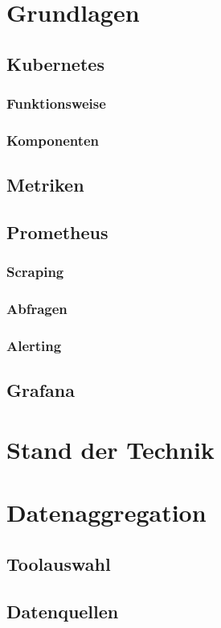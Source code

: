 \documentclass[a4paper,12pt]{scrartcl}
\begin{document}
\section{Grundlagen}
\subsection{Kubernetes}
\subsubsection{Funktionsweise}
\subsubsection{Komponenten}
\subsection{Metriken}
\subsection{Prometheus}
\subsubsection{Scraping}
\subsubsection{Abfragen}
\subsubsection{Alerting}
\subsection{Grafana}

\section{Stand der Technik}

\section{Datenaggregation}
\subsection{Toolauswahl}
\subsection{Datenquellen}
\end{document}
